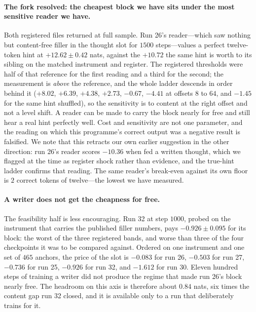\documentclass{article} %
\begin{document}
\paragraph{The fork resolved: the cheapest block we have sits under the most sensitive reader we
have.} Both registered files returned at full sample. Run 26's reader---which saw nothing but
content-free filler in the thought slot for $1500$ steps---values a perfect twelve-token hint at
$+12.62 \pm 0.42$ nats, against the $+10.72$ the same hint is worth to its sibling on the matched
instrument and register. The registered thresholds were half of that reference for the first reading
and a third for the second; the measurement is \emph{above} the reference, and the whole ladder
descends in order behind it ($+8.02$, $+6.39$, $+4.38$, $+2.73$, $-0.67$, $-4.41$ at offsets
$8$ to $64$, and $-1.45$ for the same hint shuffled), so the sensitivity is to content at the right
offset and not a level shift. A reader can be made to carry the block nearly for free and still hear
a real hint perfectly well. Cost and sensitivity are not one parameter, and the reading on which
this programme's correct output was a negative result is falsified. We note that this retracts our
own earlier suggestion in the other direction: run 26's reader scores $-10.36$ when fed a written
thought, which we flagged at the time as register shock rather than evidence, and the true-hint
ladder confirms that reading. The same reader's break-even against its own floor is $2$ correct
tokens of twelve---the lowest we have measured.

\paragraph{A writer does not get the cheapness for free.} The feasibility half is less encouraging.
Run 32 at step $1000$, probed on the instrument that carries the published filler numbers, pays
$-0.926 \pm 0.095$ for its block: the worst of the three registered bands, and worse than three of
the four checkpoints it was to be compared against. Ordered on one instrument and one set of $465$
anchors, the price of the slot is $-0.083$ for run 26, $-0.503$ for run 27, $-0.736$ for run 25,
$-0.926$ for run 32, and $-1.612$ for run 30. Eleven hundred steps of training a writer did not
produce the regime that made run 26's block nearly free. The headroom on this axis is therefore
about $0.84$ nats, six times the content gap run 32 closed, and it is available only to a run that
deliberately trains for it.
\end{document}
